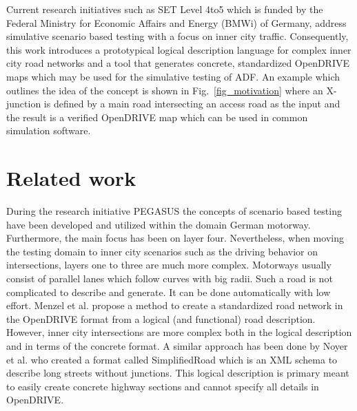 \documentclass[a4paper, 10pt, conference]{ieeeconf}      %
\begin{document}
Current research initiatives such as SET Level 4to5 which is funded by the Federal Ministry for Economic Affairs and Energy (BMWi) of Germany, address simulative scenario based testing with a focus on inner city traffic. Consequently, this work introduces a prototypical logical description language for complex inner city road networks and a tool that generates concrete, standardized OpenDRIVE maps which may be used for the simulative testing of ADF. An example which outlines the idea of the concept is shown in Fig.~\ref{fig_motivation} where an X-junction is defined by a main road intersecting an access road as the input and the result is a verified OpenDRIVE map which can be used in common simulation software.
\section{Related work}
During the research initiative PEGASUS \cite{pegasus.2019} the concepts of scenario based testing have been developed and utilized within the domain German motorway. Furthermore, the main focus has been on layer four. Nevertheless, when moving the testing domain to inner city scenarios such as the driving behavior on intersections, layers one to three are much more complex. Motorways usually consist of parallel lanes which follow curves with big radii. Such a road is not complicated to describe and generate. It can be done automatically with low effort. Menzel et al. \cite{menzel2019functional} propose a method to create a standardized road network in the OpenDRIVE format from a logical (and functional) road description. However, inner city intersections are more complex both in the logical description and in terms of the concrete format. 
A similar approach has been done by Noyer et al. \cite{dlrODRgen} who created a format called SimplifiedRoad which is an XML schema to describe long streets without junctions. This logical description is primary meant to easily create concrete highway sections and cannot specify all details in OpenDRIVE.
\end{document}
